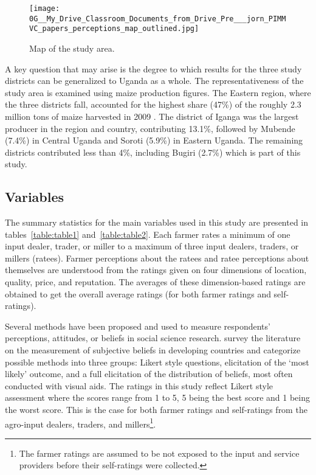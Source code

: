 \documentclass[12pt,english]{article}\usepackage[]{graphicx}\usepackage[]{color}
\begin{document}
\begin{figure}
\centering{}\texttt{[image: 0G\_\_My\_Drive\_Classroom\_Documents\_from\_Drive\_Pre\_\_\_jorn\_PIMMVC\_papers\_perceptions\_map\_outlined.jpg]}\caption{Map of the study area.\label{fig:Map-of-the-study-area}}
\end{figure}

\begin{onehalfspace}
A key question that may arise is the degree to which results for the
three study districts can be generalized to Uganda as a whole. The
representativeness of the study area is examined using maize production
figures. The Eastern region, where the three districts fall, accounted
for the highest share (47\%) of the roughly 2.3 million tons of maize
harvested in 2009 \citep{Daly2016}. The district of Iganga was the
largest producer in the region and country, contributing 13.1\%, followed
by Mubende (7.4\%) in Central Uganda and Soroti (5.9\%) in Eastern
Uganda. The remaining districts contributed less than 4\%, including
Bugiri (2.7\%) which is part of this study.
\end{onehalfspace}

\newpage{}
\begin{onehalfspace}

\subsection{Variables\label{subsec:Variables} }
\end{onehalfspace}

\begin{onehalfspace}
The summary statistics for the main variables used in this study are
presented in tables~\ref{table:table1} and~\ref{table:table2}. Each
farmer rates a minimum of one input dealer, trader, or miller to a
maximum of three input dealers, traders, or millers (ratees). Farmer
perceptions about the ratees and ratee perceptions about themselves
are understood from the ratings given on four dimensions of location,
quality, price, and reputation. The averages of these dimension-based
ratings are obtained to get the overall average ratings (for both
farmer ratings and self-ratings). 

Several methods have been proposed and used to measure respondents\textquoteright{}
perceptions, attitudes, or beliefs in social science research. \citet{Delavande2011}
survey the literature on the measurement of subjective beliefs in
developing countries and categorize possible methods into three groups:
Likert style questions, elicitation of the \textquoteleft most likely\textquoteright{}
outcome, and a full elicitation of the distribution of beliefs, most
often conducted with visual aids. The ratings in this study reflect
Likert style assessment where the scores range from 1 to 5, 5 being
the best score and 1 being the worst score. This is the case for both
farmer ratings and self-ratings from the agro-input dealers, traders,
and millers\footnote{The farmer ratings are assumed to be not exposed to the input and
service providers before their self-ratings were collected.}. 
\end{onehalfspace}
\end{document}

